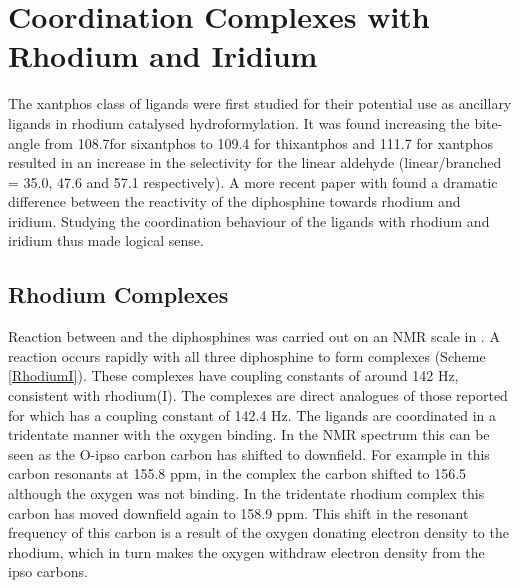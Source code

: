
\chapter{Coordination Complexes with Rhodium and Iridium}
\label{ch:rhodium}

The xantphos class of ligands were first studied for their potential use as ancillary ligands in rhodium catalysed hydroformylation\cite{Kranenburg1995}.  It was found increasing the bite-angle from 108.7\degrees for sixantphos to 109.4 \degrees for thixantphos and 111.7 \degrees for xantphos resulted in an increase in the selectivity for the linear aldehyde (linear/branched = 35.0, 47.6 and 57.1 respectively).  A more recent paper with \iPrxantphos{} found a dramatic difference between the reactivity of the diphosphine towards rhodium and iridium.  Studying the coordination behaviour of the \tBuxantphos{} ligands with rhodium and iridium thus made logical sense.

\section{Rhodium Complexes}
\label{section:experimental:rhodium}

Reaction between  and the diphosphines was carried out on an NMR scale in .  A reaction occurs rapidly with all three diphosphine to form complexes  (Scheme \ref{RhodiumI}).  These complexes have \JRhP{} coupling constants of around 142 Hz, consistent with rhodium(I).  The complexes are direct analogues of those reported for \iPrxantphos{} which has a \JRhP{} coupling constant of 142.4 Hz.\cite{Esteruelas2013}  The \tBuxantphos ligands are coordinated in a tridentate manner with the oxygen binding.  In the \carbon{} NMR spectrum this can be seen as the O-ipso carbon carbon has shifted to downfield.  For example in \tBuxantphos{} this carbon resonants at 155.8 ppm, in the complex  the carbon shifted to 156.5 although the oxygen was not binding.  In the tridentate rhodium complex this carbon has moved downfield again to 158.9 ppm.  This shift in the resonant frequency of this carbon is a result of the oxygen donating electron density to the rhodium, which in turn makes the oxygen withdraw electron density from the ipso carbons.  

